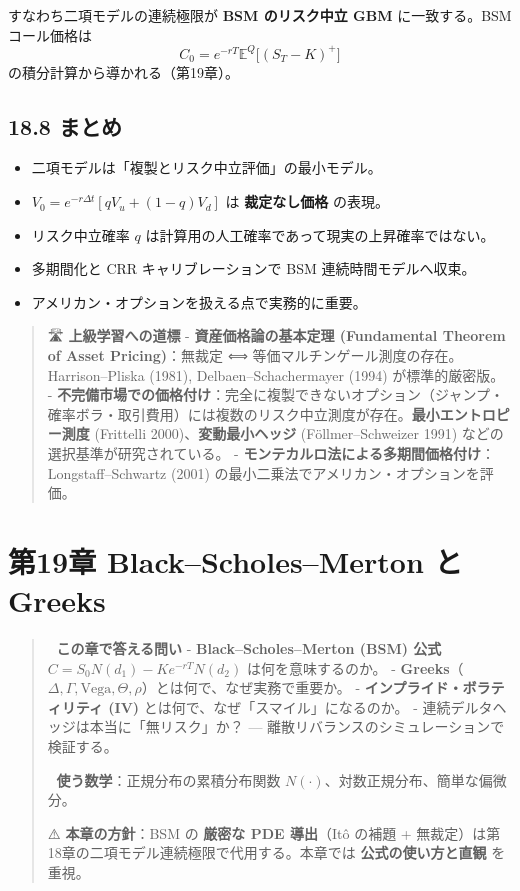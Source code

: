 \documentclass[11pt,a4paper]{report}
\begin{document}
すなわち二項モデルの連続極限が \textbf{BSM のリスク中立 GBM} に一致する。BSM コール価格は \[ C_0 = e^{-rT} \mathbb{E}^Q\!\bigl[(S_T - K)^+\bigr] \] の積分計算から導かれる（第19章）。

\section{18.8 まとめ}

\begin{itemize}
\item 二項モデルは「複製とリスク中立評価」の最小モデル。
\item $V_0 = e^{-r\Delta t}[q V_u + (1-q) V_d]$ は \textbf{裁定なし価格} の表現。
\item リスク中立確率 $q$ は計算用の人工確率であって現実の上昇確率ではない。
\item 多期間化と CRR キャリブレーションで BSM 連続時間モデルへ収束。
\item アメリカン・オプションを扱える点で実務的に重要。
\end{itemize}

\begin{quote}
🛣 \textbf{上級学習への道標}
- \textbf{資産価格論の基本定理 (Fundamental Theorem of Asset Pricing)}：無裁定 ⟺ 等価マルチンゲール測度の存在。Harrison–Pliska (1981), Delbaen–Schachermayer (1994) が標準的厳密版。
- \textbf{不完備市場での価格付け}：完全に複製できないオプション（ジャンプ・確率ボラ・取引費用）には複数のリスク中立測度が存在。\textbf{最小エントロピー測度} (Frittelli 2000)、\textbf{変動最小ヘッジ} (Föllmer–Schweizer 1991) などの選択基準が研究されている。
- \textbf{モンテカルロ法による多期間価格付け}：Longstaff–Schwartz (2001) の最小二乗法でアメリカン・オプションを評価。
\end{quote}

\noindent\hrulefill

\chapter{第19章 Black–Scholes–Merton と Greeks}

\begin{quote}
🎯 \textbf{この章で答える問い}
- \textbf{Black–Scholes–Merton (BSM) 公式} $C = S_0 N(d_1) - K e^{-rT} N(d_2)$ は何を意味するのか。
- \textbf{Greeks}（$\Delta, \Gamma, \mathrm{Vega}, \Theta, \rho$）とは何で、なぜ実務で重要か。
- \textbf{インプライド・ボラティリティ (IV)} とは何で、なぜ「スマイル」になるのか。
- 連続デルタヘッジは本当に「無リスク」か？ — 離散リバランスのシミュレーションで検証する。

📐 \textbf{使う数学}：正規分布の累積分布関数 $N(\cdot)$、対数正規分布、簡単な偏微分。

⚠️ \textbf{本章の方針}：BSM の \textbf{厳密な PDE 導出}（Itô の補題 + 無裁定）は第18章の二項モデル連続極限で代用する。本章では \textbf{公式の使い方と直観} を重視。
\end{quote}
\end{document}
